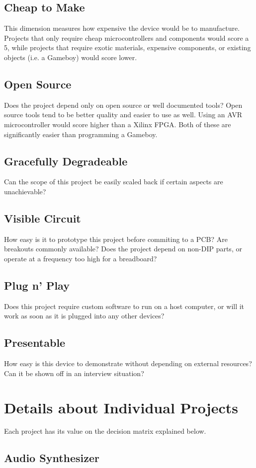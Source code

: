 \documentclass{article}
\begin{document}
\subsection{Cheap to Make}
This dimension measures how expensive the device would be to
manufacture. Projects that only require cheap microcontrollers and
components would score a 5, while projects that require exotic
materials, expensive components, or existing objects (i.e. a Gameboy)
would score lower. 
\subsection{Open Source}
Does the project depend only on open source or well documented tools?
Open source tools tend to be better quality and easier to use as well.
Using an AVR microcontroller would score higher than a Xilinx
FPGA. Both of these are significantly easier than programming a Gameboy.
\subsection{Gracefully Degradeable}
Can the scope of this project be easily scaled back if certain aspects are
unachievable? 
\subsection{Visible Circuit}
How easy is it to prototype this project before commiting to a PCB?
Are breakouts commonly available? Does the project depend on non-DIP
parts, or operate at a frequency too high for a breadboard?
\subsection{Plug n' Play}
Does this project require custom software to run on a host computer,
or will it work as soon as it is plugged into any other devices?
\subsection{Presentable}
How easy is this device to demonstrate without depending on external
resources? Can it be shown off in an interview situation?

\section{Details about Individual Projects}
Each project has its value on the decision matrix explained below. 

\subsection{Audio Synthesizer}
\end{document}
